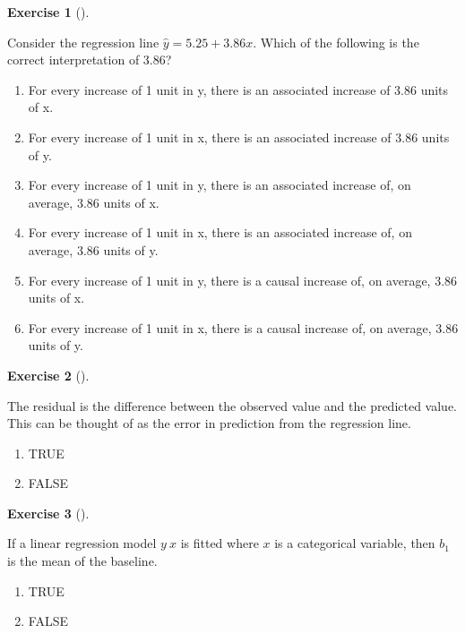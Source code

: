 \documentclass[
  letterpaper,
  DIV=11,
  numbers=noendperiod]{scrreprt}
\providecommand{\tightlist}{%
  \setlength{\itemsep}{0pt}\setlength{\parskip}{0pt}}\usepackage{longtable,booktabs,array}
\theoremstyle{definition}
\newtheorem{exercise}{Exercise}[chapter]
\theoremstyle{remark}
\begin{document}
\begin{exercise}[]\protect\hypertarget{exr-ch05-c07}{}\label{exr-ch05-c07}

Consider the regression line \(\hat{y}=5.25+3.86x\). Which of the
following is the correct interpretation of 3.86?

\begin{enumerate}
\def\labelenumi{\alph{enumi})}
\tightlist
\item
  For every increase of 1 unit in y, there is an associated increase of
  3.86 units of x.
\item
  For every increase of 1 unit in x, there is an associated increase of
  3.86 units of y.
\item
  For every increase of 1 unit in y, there is an associated increase of,
  on average, 3.86 units of x.
\item
  For every increase of 1 unit in x, there is an associated increase of,
  on average, 3.86 units of y.
\item
  For every increase of 1 unit in y, there is a causal increase of, on
  average, 3.86 units of x.
\item
  For every increase of 1 unit in x, there is a causal increase of, on
  average, 3.86 units of y.
\end{enumerate}

\end{exercise}

\begin{exercise}[]\protect\hypertarget{exr-ch05-c08}{}\label{exr-ch05-c08}

The residual is the difference between the observed value and the
predicted value. This can be thought of as the error in prediction from
the regression line.

\begin{enumerate}
\def\labelenumi{\alph{enumi})}
\tightlist
\item
  TRUE
\item
  FALSE
\end{enumerate}

\end{exercise}

\begin{exercise}[]\protect\hypertarget{exr-ch05-c09}{}\label{exr-ch05-c09}

If a linear regression model \(y ~ x\) is fitted where \(x\) is a
categorical variable, then \(b_1\) is the mean of the baseline.

\begin{enumerate}
\def\labelenumi{\alph{enumi})}
\tightlist
\item
  TRUE
\item
  FALSE
\end{enumerate}

\end{exercise}
\end{document}
